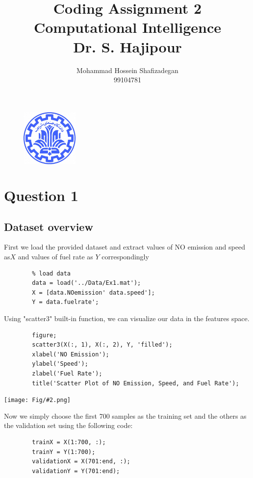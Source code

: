 \documentclass[]{article}
\author{
	Mohammad Hossein Shafizadegan\\
	99104781
}
\title{
	Coding Assignment 2 \\
	Computational Intelligence  \\
	Dr. S. Hajipour
}
\newcommand{\pict}[2]{\begin{center}
		\texttt{[image: Fig/\#2.png]}
\end{center}}
\begin{document}
	\begin{figure}
		\includegraphics[width=0.25\textwidth]{Fig/Sharif.png}
		\centering
	\end{figure}
	\maketitle
	\tableofcontents
	\newpage
	\section{Question 1}
	\subsection{Dataset overview}
	First we load the provided dataset and extract values of NO emission and speed as$X$ and values of fuel rate as $Y$ correspondingly
	\begin{lstlisting}
		% load data
		data = load('../Data/Ex1.mat');
		X = [data.NOemission' data.speed'];
		Y = data.fuelrate';
	\end{lstlisting}
	Using "scatter3" built-in function, we can visualize our data in the features space.
	\begin{lstlisting}
		figure;
		scatter3(X(:, 1), X(:, 2), Y, 'filled');
		xlabel('NO Emission');
		ylabel('Speed');
		zlabel('Fuel Rate');
		title('Scatter Plot of NO Emission, Speed, and Fuel Rate');
	\end{lstlisting}
	\pict{1}{F1}
	Now we simply choose the first 700 samples as the training set and the others as the validation set using the following code:
	\begin{lstlisting}
		trainX = X(1:700, :);
		trainY = Y(1:700);
		validationX = X(701:end, :);
		validationY = Y(701:end);
	\end{lstlisting}
\end{document}
